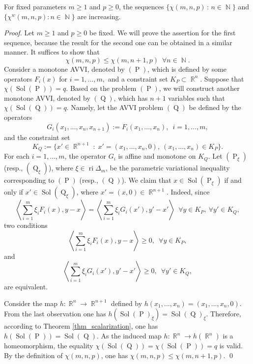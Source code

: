 \documentclass[smallextended,envcountsect]{svjour3}       %
\DeclareMathOperator{\Sol}{Sol}
\DeclareMathOperator{\Pa}{P}
\DeclareMathOperator{\Q}{Q}
\DeclareMathOperator{\ri}{ri}
\DeclareMathOperator{\N}{\mathbb{N}}
\DeclareMathOperator{\R}{\mathbb{R}}
\begin{document}
\begin{proposition}\label{nondecreasingn} For fixed parameters $m\geq 1$ and $p\geq 0$, the sequences $\{\chi(m,n,p)\,:\,n\in \N\}$ and $\{\chi^w(m,n,p):n\in \N\}$ are increasing.
\end{proposition}
\begin{proof} Let $m\geq 1$ and $p\geq 0$ be fixed. We will prove the assertion for the first sequence, because the result for the second one can be obtained in a similar manner. It suffices to show that $$\chi(m,n,p) \leq\chi(m,n+1,p)\ \; \forall n\in \N.$$
Consider a monotone AVVI, denoted by $(\Pa)$, which is defined by some operators $F_i(x)$ for $ i=1,...,m,$ and a constraint set $K_P\subset \R^n$. Suppose that $\chi(\Sol(\Pa))=q$. Based on the problem $(\Pa)$, we will construct another monotone AVVI, denoted by $(\Q)$, which has ${n+1}$ variables such that $\chi(\Sol(\Q))=q$. Namely, let the AVVI problem $(\Q)$ be defined by the operators
	$$G_i(x_1,...,x_{n},x_{n+1}):=F_i(x_1,...,x_{n}),\ \; i=1,...,m,$$ and the constraint set $$K_Q:=\{x'\in \R^{n+1}\;:\;x'=(x_1,...,x_{n},0),\ (x_1,...,x_{n})\in K_P\}.$$
	For each $i=1,...,m$, the operator $G_i$ is affine and monotone on $K_Q$. 	
Let $(\Pa_{\xi})$ (resp., $(\Q_{\xi})$), where $\xi \in \ri\Delta_m$,  be the parametric variational inequality corresponding to  $(\Pa)$ (resp., $(\Q)$). We claim that $x\in \Sol(\Pa_{\xi})$ if and only if $x'\in \Sol(\Q_{\xi})$, where $x'=(x,0)\in \R^{n+1}$. Indeed, since
	$$\left\langle \sum_{i=1}^m\xi_iF_i(x),y-x\right\rangle=\left\langle \sum_{i=1}^m\xi_iG_i(x'),y'-x'\right\rangle\ \;  \forall y\in K_P, \ \forall y'\in K_Q,$$ two conditions 
	 $$	\left\langle  \sum_{i=1}^m\xi_iF_i(x),y-x\right\rangle  \geq 0,\ \; \forall y\in
	K_P,$$
and 
$$\left\langle \sum_{i=1}^m\xi_iG_i(x'),y'-x'\right\rangle  \geq 0,\ \; \forall y'\in K_Q,$$ are equivalent. 
	
Consider the map $h:\R^{n} \to \R^{n+1}$ defined by $h(x_1,...,x_{n}) =(x_1,...,x_{n},0).$ From the last observation one has $h(\Sol(\Pa)_\xi)=\Sol(\Q)_\xi$. Therefore, according to Theorem \ref{thm_scalarization}, one has $h(\Sol(\Pa))=\Sol(\Q)$. As the induced map $h:\R^{n} \to h(\R^{n})$ is a homeomorphism,  the equality  $\chi(\Sol(\Q))=\chi(\Sol(\Pa))=q$ is valid.
By the definition of $\chi(m,n,p)$, one has $\chi(m,n,p) \leq \chi(m,n+1,p)$. \qed
\end{proof}
\end{document}
